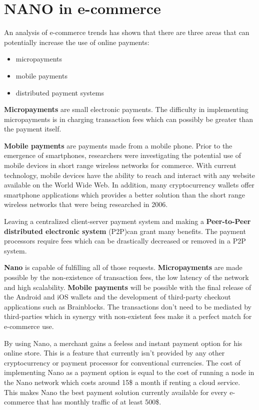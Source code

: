 \documentclass{ferseminar}
\begin{document}
\section{NANO in e-commerce}
An analysis of e-commerce trends \cite{Lowry} has shown that there are three areas that can potentially increase the use of online payments:
\begin{itemize}
	\item micropayments
	\item mobile payments
	\item distributed payment systems
\end{itemize}

\textbf{Micropayments} are small electronic payments. The difficulty in implementing micropayments is in charging transaction fees which can possibly be greater than the payment itself.

\textbf{Mobile payments} are payments made from a mobile phone. Prior to the emergence of smartphones, researchers were investigating the potential use of mobile devices in short range wireless networks for commerce. With current technology, mobile devices have the ability to reach and interact with any website available on the World Wide Web. In addition, many cryptocurrency wallets offer smartphone applications which provides a better solution than the short range wireless networks that were being researched in 2006.  

Leaving a centralized client-server payment system and making a \textbf{Peer-to-Peer distributed electronic system} (P2P)can grant many benefits. The payment processors require fees which can be drastically decreased or removed in a P2P system.

\textbf{Nano} is capable of fulfilling all of those requests. \textbf{Micropayments} are made possible by the non-existence of transaction fees, the low latency of the network and high scalability. \textbf{Mobile payments} will be possible with the final release of the Android and iOS wallets and the development of third-party checkout applications such as Brainblocks. The transactions don't need to be mediated by third-parties which in synergy with non-existent fees make it a perfect match for e-commerce use.

By using Nano, a merchant gains a feeless and instant payment option for his online store. This is a feature that currently isn't provided by any other cryptocurrency or payment processor for conventional currencies. The cost of implementing Nano as a payment option is equal to the cost of running a node in the Nano network which costs around 15\$ a month if renting a cloud service. This makes Nano the best payment solution currently available for every e-commerce that has monthly traffic of at least 500\$.
\end{document}
